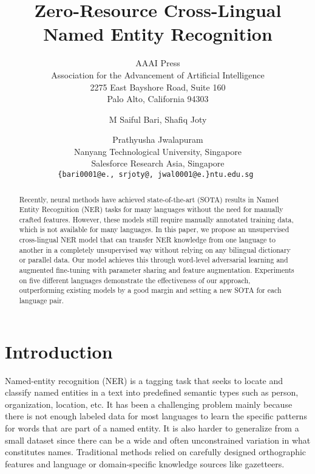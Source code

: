 \documentclass[letterpaper]{article} \usepackage{aaai20}  \usepackage{times}  \usepackage{helvet} \usepackage{courier}  \usepackage[hyphens]{url}  \usepackage{graphicx} \urlstyle{rm} \def\UrlFont{\rm}  \usepackage{graphicx}  \frenchspacing  \setlength{\pdfpagewidth}{8.5in}  \setlength{\pdfpageheight}{11in}
\begin{document}
\title{Zero-Resource Cross-Lingual Named Entity Recognition}

\author{AAAI Press\\
Association for the Advancement of Artificial Intelligence\\
2275 East Bayshore Road, Suite 160\\
Palo Alto, California 94303\\
}

\author{M Saiful Bari, Shafiq Joty \and Prathyusha Jwalapuram\\
  Nanyang Technological University, Singapore \\
  Salesforce Research Asia, Singapore \\
  \texttt{\{bari0001@e., srjoty@, jwal0001@e.\}ntu.edu.sg } \\}
  







\maketitle
\begin{abstract}

Recently, neural methods have achieved state-of-the-art (SOTA) results in Named Entity Recognition (NER) tasks for many languages without the need for manually crafted features. However, these models still require manually annotated training data, which is not available for many languages. In this paper, we propose an unsupervised cross-lingual NER model that can transfer NER  knowledge from one language to another in a completely unsupervised way without relying on any bilingual dictionary or parallel data. Our model achieves this through word-level adversarial learning and augmented fine-tuning with parameter sharing and feature augmentation. Experiments on five different languages demonstrate the effectiveness of our approach, outperforming existing models by a good margin and setting a new SOTA for each language pair.

\end{abstract}

\section{Introduction}



Named-entity recognition (NER) is a tagging task that seeks to locate and classify named entities in a text into predefined semantic types such as person, organization, location, etc. It has been a challenging problem mainly because there is not enough labeled data for most languages to learn the specific patterns for words that are part of a named entity. It is also harder to generalize from a small dataset since there can be a wide and often unconstrained variation in what constitutes names. Traditional methods relied on carefully designed orthographic features and language or domain-specific knowledge sources like gazetteers. 
\end{document}

